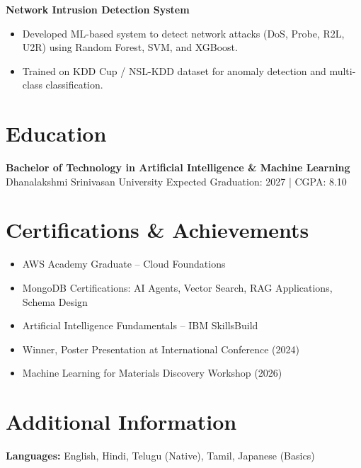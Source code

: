 \documentclass[a4paper,10pt]{article}
\begin{document}
\textbf{Network Intrusion Detection System}
\begin{itemize}
  \item Developed ML-based system to detect network attacks (DoS, Probe, R2L, U2R) using Random Forest, SVM, and XGBoost.
  \item Trained on KDD Cup / NSL-KDD dataset for anomaly detection and multi-class classification.
\end{itemize}

\section*{Education}

\textbf{Bachelor of Technology in Artificial Intelligence \& Machine Learning}\\
Dhanalakshmi Srinivasan University \hfill Expected Graduation: 2027 \;|\; CGPA: 8.10

\section*{Certifications \& Achievements}
\begin{itemize}
  \item AWS Academy Graduate -- Cloud Foundations
  \item MongoDB Certifications: AI Agents, Vector Search, RAG Applications, Schema Design
  \item Artificial Intelligence Fundamentals -- IBM SkillsBuild
  \item Winner, Poster Presentation at International Conference (2024)
  \item Machine Learning for Materials Discovery Workshop (2026)
\end{itemize}

\section*{Additional Information}
\textbf{Languages:} English, Hindi, Telugu (Native), Tamil, Japanese (Basics)
\end{document}
